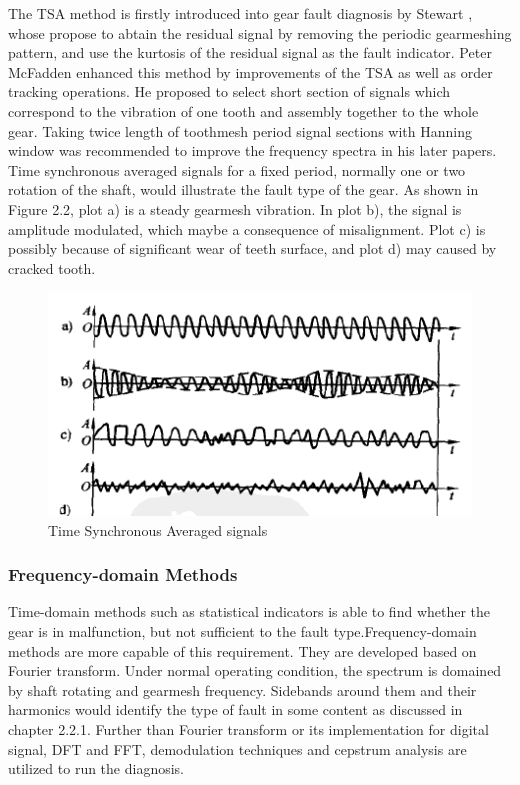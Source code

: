 The TSA method is firstly introduced into gear fault diagnosis by Stewart \cite{stewart}, whose propose to abtain the residual signal by removing the periodic gearmeshing pattern, and use the kurtosis of the residual signal as the fault indicator. Peter McFadden \cite{mc2} enhanced this method by improvements of the TSA as well as order tracking operations. He proposed to select short section of signals which correspond to the vibration of one tooth and assembly together to the whole gear. Taking twice length of toothmesh period signal sections with Hanning window was recommended to improve the frequency spectra in his later papers. \cite{mc3} Time synchronous averaged signals for a fixed period, normally one or two rotation of the shaft, would illustrate the fault type of the gear. As shown in Figure 2.2, plot a) is a steady gearmesh vibration. In plot b), the signal is amplitude modulated, which maybe a consequence of misalignment. Plot c) is possibly because of significant wear of teeth surface, and plot d) may caused by cracked tooth.

\begin{figure}
	\centering
	\includegraphics{TSA}
	\caption{Time Synchronous Averaged signals \cite{chen}}
	\label{tsa}
\end{figure}


\subsubsection{Frequency-domain Methods}

Time-domain methods such as statistical indicators is able to find whether the gear is in malfunction, but not sufficient to the fault type.Frequency-domain methods are more capable of this requirement. They are developed based on Fourier transform. Under normal operating condition, the spectrum is domained by shaft rotating and gearmesh frequency. Sidebands around them and their harmonics would identify the type of fault in some content as discussed in chapter 2.2.1.
Further than Fourier transform or its implementation for digital signal, DFT and FFT, demodulation techniques and cepstrum analysis are utilized to run the diagnosis.

